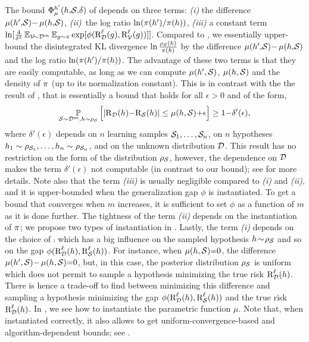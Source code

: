 \documentclass[twoside]{article}
\theoremstyle{plain}
\begin{document}
The bound $\PhiComp^{h'}(h{,}\Scal{,}\delta)$ of  depends on three terms: {\it (i)} the difference $\comp(h'{,}\Scal){-}\comp(h{,}\Scal)$, \mbox{{\it (ii)} the} log ratio $\ln({\P(h')}/{\P(h)})$, {\it (iii)} a constant term $\ln[\frac{4}{\delta^2}\EE_{\Vcal\!{\sim}\Dcal^m}\EE_{g{\sim}\P} \exp[\phi(\RiskLoss_{\Dcal}(g),\RiskLoss_{\Vcal}(g))]]$.
Compared to , we essentially upper-bound the disintegrated KL divergence $\ln\frac{\AQ(h)}{\P(h)}$ by the difference $\comp(h'{,}\Scal){-}\comp(h{,}\Scal)$ and the log ratio $\ln({\P(h')}/{\P(h)})$. 
The advantage of these two terms is that they are easily computable, as long as we can compute $\comp(h',\Scal)$, $\comp(h,\Scal)$ and the density of $\P$ (up to its normalization constant).
This is in contrast with the the result of \citet{lee2020neural}, that is essentially a bound that holds for all $\epsilon>0$ and of the form,
\begin{align*}
\PP_{\Scal\sim\Dcal^m,h\sim\AQ}\Big[ |\Risk_{\Dcal}(h){-}\Risk_{\Scal}(h)| \le \comp(h, \Scal){+}\epsilon \Big]\ge 1{-}\delta'(\epsilon),
\end{align*}
where $\delta'(\epsilon)$ depends on $n$ learning samples $\Scal_1,\dots,\Scal_n$, on $n$ hypotheses $h_1\sim \Q_{\Scal_1},\dots,h_n\sim\Q_{\Scal_n}$, and on the unknown distribution $\Dcal$.
This result has no restriction on the form of the distribution $\AQ$, however, the dependence on $\Dcal$ makes the term $\delta'(\epsilon)$ not computable (in contrast to our bound); see  for more details.
Note also that the term {\it (iii)} is usually negligible compared to {\it (i)} and {\it (ii)}, and it is upper-bounded when the generalization gap $\phi$ is instantiated.
To get a bound that converges when $m$ increases, it is sufficient to set $\phi$ as a function of $m$ as it is done further.
The tightness of the term {\it (ii)} depends on the instantiation of $\P$; we propose two types of instantiation in . 
Lastly, the term {\it (i)} depends on the choice of $\comp$ which has a big influence on the sampled hypothesis $h\!\sim\!\AQ$ and so on the gap $\phi(\RiskLoss_{\Dcal}(h), \RiskLoss_{\Scal}(h))$. 
For instance, when $\comp(h,\Scal){=}0$, the difference $\comp(h', \Scal){-}\comp(h, \Scal){=}0$, but, in this case, the posterior distribution $\AQ$ is uniform which does not permit to sample a hypothesis minimizing the true risk $\RiskLoss_{\Dcal}(h)$.
There is hence a trade-off to find between minimizing this difference and sampling a hypothesis minimizing the gap $\phi(\RiskLoss_{\Dcal}(h), \RiskLoss_{\Scal}(h))$ and the true risk $\RiskLoss_{\Dcal}(h)$.
In , we see how to instantiate the parametric function $\mu$.
Note that, when instantiated correctly, it also allows to get uniform-convergence-based and algorithm-dependent bounds; see .
\end{document}
